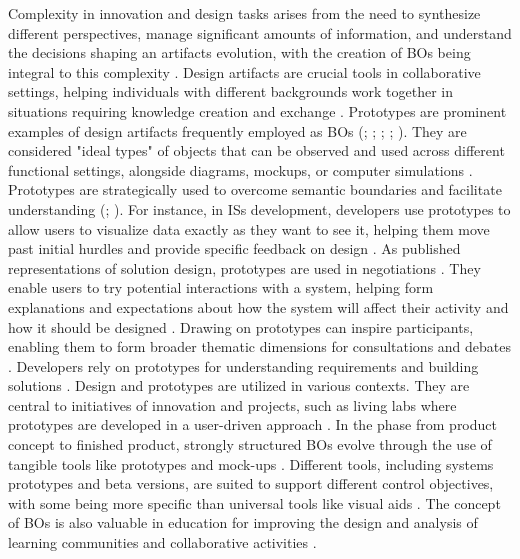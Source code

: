 \documentclass[12pt,oneside]{article}
\begin{document}
Complexity in innovation and design tasks arises from the need to synthesize different perspectives, manage significant amounts of information, and understand the decisions shaping an artifacts evolution, with the creation of \ac{BO}s being integral to this complexity \citep[13]{koskinen2005metaphoric}. Design artifacts are crucial tools in collaborative settings, helping individuals with different backgrounds work together in situations requiring knowledge creation and exchange \citep[3]{gantman2011boundary}. Prototypes are prominent examples of design artifacts frequently employed as \ac{BO}s (\citealp[321]{rosenkranz2014boundary}; \citealp[5118]{weeger2017artefacts}; \citealp[580]{doolin2012sociomateriality}; \citealp[8]{gantman2011boundary}; \citealp[16]{koskinen2005metaphoric}). They are considered "ideal types" of objects that can be observed and used across different functional settings, alongside diagrams, mockups, or computer simulations \citep[4]{ghazawneh2010governing}. Prototypes are strategically used to overcome semantic boundaries and facilitate understanding (\citealp[3219]{rosenkranz2014boundary}; \citealp[578]{doolin2012sociomateriality}). For instance, in \ac{IS}s development, developers use prototypes to allow users to visualize data exactly as they want to see it, helping them move past initial hurdles and provide specific feedback on design \citep[335-336]{pawlowski2000supporting}. As published representations of solution design, prototypes are used in negotiations \citep[580]{doolin2012sociomateriality}. They enable users to try potential interactions with a system, helping form explanations and expectations about how the system will affect their activity and how it should be designed \citep[5116, 5120]{weeger2017artefacts}. Drawing on prototypes can inspire participants, enabling them to form broader thematic dimensions for consultations and debates \citep[8]{bakhaev2023cocreating}. Developers rely on prototypes for understanding requirements and building solutions \citep[576]{doolin2012sociomateriality}. \newline
Design and prototypes are utilized in various contexts. They are central to initiatives of innovation and projects, such as living labs where prototypes are developed in a user-driven approach \citep[4]{johansson2013cocreation}. In the phase from product concept to finished product, strongly structured \ac{BO}s evolve through the use of tangible tools like prototypes and mock-ups \citep[16]{koskinen2005metaphoric}. Different tools, including systems prototypes and beta versions, are suited to support different control objectives, with some being more specific than universal tools like visual aids \citep[8]{gantman2011boundary}. The concept of \ac{BO}s is also valuable in education for improving the design and analysis of learning communities and collaborative activities \citep[2]{fominykh2016boundary}. \newline
\end{document}
